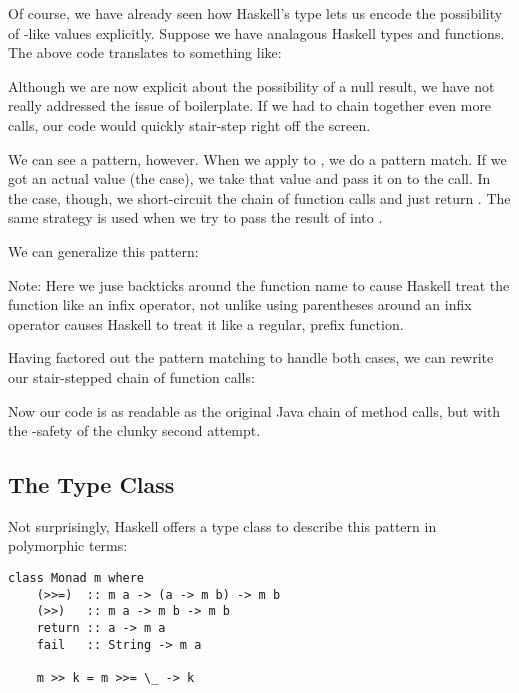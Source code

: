Of course, we have already seen how Haskell's  type lets us encode the possibility of -like values
explicitly. Suppose we have analagous Haskell types and functions. The above code translates to something like:



Although we are now explicit about the possibility of a null result, we have not really addressed the issue of boilerplate.
If we had to chain together even more calls, our code would quickly stair-step right off the screen.

We can see a pattern, however. When we apply  to , we do a pattern match. If we got an
actual value (the  case), we take that value and pass it on to the  call. In the 
case, though, we short-circuit the chain of function calls and just return . The same strategy is used when
we try to pass the result of  into .
 
We can generalize this pattern:



Note: Here we juse backticks around the function name to cause Haskell treat the function like an infix operator, not unlike
using parentheses around an infix operator causes Haskell to treat it like a regular, prefix function.

Having factored out the pattern matching to handle both cases, we can rewrite our stair-stepped chain of function calls:




Now our code is as readable as the original Java chain of method calls, but with the -safety of the clunky second attempt.

\subsection{The  Type Class}

Not surprisingly, Haskell offers a type class to describe this pattern in polymorphic terms:

\begin{lstlisting}
class Monad m where
    (>>=)  :: m a -> (a -> m b) -> m b
    (>>)   :: m a -> m b -> m b
    return :: a -> m a 
    fail   :: String -> m a

    m >> k = m >>= \_ -> k
\end{lstlisting}

